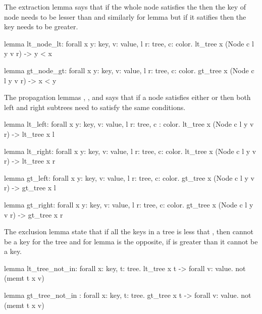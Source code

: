 The extraction lemma  says that if the whole node satisfies the  then the key of
node needs to be lesser than  and similarly for lemma  but if it satifies 
then the key needs to be greater.

\begin{whylang}
    lemma lt_node_lt:
        forall x y: key, v: value, l r: tree, c: color.
        lt_tree x (Node c l y v r) -> y < x

    lemma gt_node_gt:
        forall x y: key, v: value, l r: tree, c: color.
        gt_tree x (Node c l y v r) -> x < y
\end{whylang}

The propagation lemmas , ,  and  says that
if a node satisfies either  or  then both left and right subtrees need to satisfy
the same conditions.

\begin{whylang}
    lemma lt_left:
        forall x y: key, v: value, l r: tree, c : color.
        lt_tree x (Node c l y v r) -> lt_tree x l

    lemma lt_right:
        forall x y: key, v: value,  l r: tree, c: color.
        lt_tree x (Node c l y v r) -> lt_tree x r

    lemma gt_left:
        forall x y: key, v: value, l r: tree, c: color.
        gt_tree x (Node c l y v r) -> gt_tree x l

    lemma gt_right:
        forall x y: key, v: value, l r: tree, c: color.
        gt_tree x (Node c l y v r) -> gt_tree x r
\end{whylang}

The exclusion lemma  state that if all the keys in a tree is less that , then  
cannot be a key for the tree and for lemma  is the opposite, if  is greater than it cannot be a key.

\begin{whylang}
    lemma lt_tree_not_in:
        forall x: key, t: tree. lt_tree x t -> forall v: value. not (memt t x v)

    lemma gt_tree_not_in :
        forall x: key, t: tree. gt_tree x t -> forall v: value. not (memt t x v)
\end{whylang}

